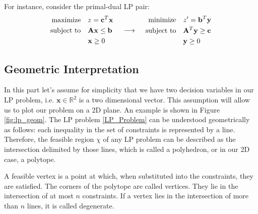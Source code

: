 For instance, consider the primal-dual LP pair:
\[
    \begin{array}{c@{\quad}c@{\quad}c}
        \begin{aligned}
            \text{maximize} \quad   & z = \mathbf{c}^T \mathbf{x}           \\
            \text{subject to} \quad & \mathbf{A} \mathbf{x} \leq \mathbf{b} \\
                                    & \mathbf{x} \geq 0                     \\
        \end{aligned}
         &
        \begin{array}{c}
            \longrightarrow
        \end{array}
         &
        \begin{aligned}
            \text{minimize} \quad   & z' = \mathbf{b}^T \mathbf{y}            \\
            \text{subject to} \quad & \mathbf{A}^T \mathbf{y} \geq \mathbf{c} \\
                                    & \mathbf{y} \geq 0                       \\
        \end{aligned}
    \end{array}
\]

\subsection{Geometric Interpretation}
In this part let's assume for simplicity that we have two decision variables in our LP problem, i.e. $\mathbf{x} \in \mathbb{R}^2 $ is a two dimensional vector. This assumption will allow us to plot our problem on a 2D plane. An example is shown in Figure \ref{fig:lp_geom}. The LP problem \ref{LP_Problem} can be understood geometrically as follows: each inequality in the set of constraints is represented by a line. Therefore, the feasible region $\chi$ of any LP problem can be described as the intersection delimited by those lines, which is called a polyhedron, or in our 2D case, a polytope.

A feasible vertex is a point at which, when substituted into the constraints, they are satisfied.
The corners of the polytope are called vertices.
They lie in the intersection of at most $n$ constraints. If a vertex lies in the intersection of more than $n$ lines, it is called degenerate.

